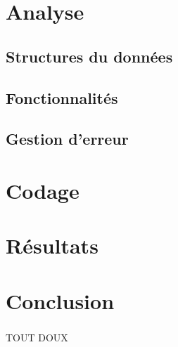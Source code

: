 \documentclass{report}
\begin{document}
    \paragraph*{}


\chapter{Analyse}
    \section*{Structures du données}
        \paragraph*{}

    \section*{Fonctionnalités}
        \paragraph*{}

    \section*{Gestion d'erreur}
        \paragraph*{}


\chapter{Codage}
    \paragraph*{}


\chapter{Résultats}
    \paragraph*{}



\chapter*{Conclusion}
    \paragraph*{}
TOUT DOUX
\end{document}
